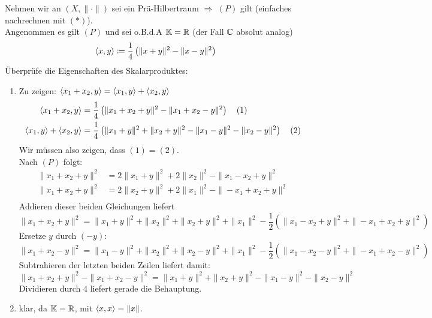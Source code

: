 \begin{beweis}
	Nehmen wir an $(X, \| \cdot \|)$ sei ein Prä-Hilbertraum $\Rightarrow$ \hyperref[eq:15.6-rallelogrammGleichung]{$(P)$} gilt (einfaches nachrechnen mit \hyperref[eq:15.2-*]{$(*)$}). \\
	Angenommen es gilt \hyperref[eq:15.6-rallelogrammGleichung]{$(P)$} und sei o.B.d.A $\mathbb{K} = \mathbb{R}$ (der Fall $\mathbb{C}$ absolut analog) 
	\[  \langle x, y \rangle \coloneqq \frac{1}{4} \left( \| x + y \|^{2} - \| x - y \|^{2} \right) \]
	Überprüfe die Eigenschaften des Skalarproduktes:
	\begin{enumerate}[label=\roman*\upshape)]
		\item Zu zeigen: $\langle x_{1} + x_{2}, y \rangle = \langle x_{1}, y \rangle + \langle x_{2}, y \rangle$
			\begin{align*}
				\langle x_{1} + x_{2}, y \rangle & = \frac{1}{4} \left( \| x_{1} + x_{2} + y \|^{2} - \| x_{1} + x_{2} - y \|^{2} \right) \quad (1) \\
				\langle x_{1}, y \rangle + \langle x_{2}, y \rangle & = \frac{1}{4} \left( \| x_{1} + y \|^{2} + \| x_{2} + y \|^{2} - \| x_{1} - y \|^{2} - \| x_{2} - y \|^{2} \right) \quad (2)
			\end{align*}
			Wir müssen also zeigen, dass $(1) = (2)$. \\
			Nach \hyperref[eq:15.6-rallelogrammGleichung]{$(P)$} folgt:
			\begin{align*}
				\| x_{1} + x_{2} + y \|^{2} & = 2 \| x_{1} + y \|^{2} + 2 \| x_{2} \|^{2} - \| x_{1} - x_{2} + y \|^{2} \\
				\| x_{1} + x_{2} + y \|^{2} & = 2 \| x_{2} + y \|^{2} + 2 \| x_{1} \|^{2} - \| - x_{1} + x_{2} + y \|^{2} \\
			\end{align*}
			Addieren dieser beiden Gleichungen liefert
			\[ \| x_{1} + x_{2} + y \|^{2} =  \| x_{1} + y \|^{2} + \| x_{2} \|^{2} + \| x_{2} + y \|^{2} +  \| x_{1} \|^{2} - \frac{1}{2} \left( \| x_{1} - x_{2} + y \|^{2} + \| - x_{1} + x_{2} + y \|^{2} \right) \]
			Ersetze $y$ durch $(-y)$:
			\[ \| x_{1} + x_{2} - y \|^{2} =  \| x_{1} - y \|^{2} + \| x_{2} \|^{2} + \| x_{2} - y \|^{2} +  \| x_{1} \|^{2} - \frac{1}{2} \left( \| x_{1} - x_{2} - y \|^{2} + \| - x_{1} + x_{2} - y \|^{2} \right) \]
			Subtrahieren der letzten beiden Zeilen liefert damit:
			\[ \| x_{1} + x_{2} + y \|^{2} - \| x_{1} + x_{2} - y \|^{2} = \| x_{1} + y \|^{2} + \| x_{2} + y \|^{2} - \| x_{1} - y \|^{2} - \| x_{2} - y \| ^{2} \]
			Dividieren durch $4$ liefert gerade die Behauptung.
		\item klar, da $\mathbb{K} = \mathbb{R}$, mit $\langle x, x \rangle = \| x \|$.

\end{enumerate}
\end{beweis}

